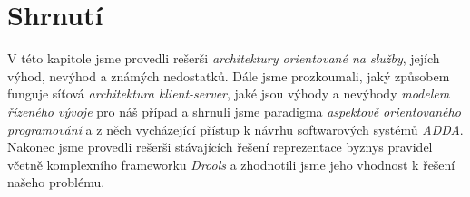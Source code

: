 \section{Shrnutí}

V této kapitole jsme provedli rešerši \textit{architektury orientované
na služby}, jejích výhod, nevýhod a známých nedostatků. Dále jsme
prozkoumali, jaký způsobem funguje síťová \textit{architektura klient-server},
jaké jsou výhody a nevýhody \textit{modelem řízeného vývoje} pro náš případ
a shrnuli jsme paradigma \textit{aspektově orientovaného programování} a
z něch vycházející přístup k návrhu softwarových systémů \textit{ADDA}.
Nakonec jsme provedli rešerši stávajících řešení reprezentace byznys pravidel
včetně komplexního frameworku \textit{Drools} a zhodnotili jsme jeho vhodnost
k řešení našeho problému.
